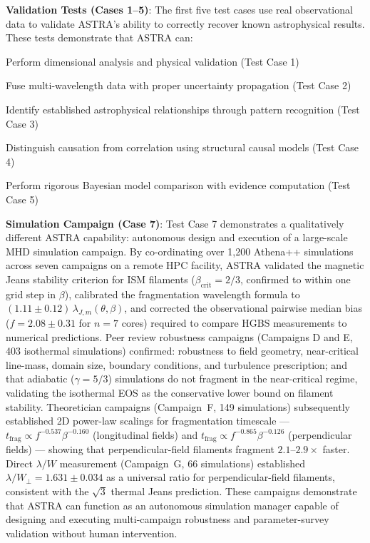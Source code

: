 \documentclass[usenatbib]{rasti}
\begin{document}
\textbf{Validation Tests (Cases 1--5)}: The first five test cases use real observational data to validate ASTRA's ability to correctly recover known astrophysical results. These tests demonstrate that ASTRA can:
\begin{description}
\item Perform dimensional analysis and physical validation (Test Case 1)
\item Fuse multi-wavelength data with proper uncertainty propagation (Test Case 2)
\item Identify established astrophysical relationships through pattern recognition (Test Case 3)
\item Distinguish causation from correlation using structural causal models (Test Case 4)
\item Perform rigorous Bayesian model comparison with evidence computation (Test Case 5)
\end{description}

\textbf{Simulation Campaign (Case 7)}: Test Case 7 demonstrates a qualitatively different
ASTRA capability: autonomous design and execution of a large-scale MHD simulation campaign.
By co-ordinating over 1,200 Athena++ simulations across seven campaigns on a remote HPC
facility, ASTRA validated the magnetic Jeans stability criterion for ISM filaments
($\beta_\mathrm{crit} = 2/3$, confirmed to within one grid step in $\beta$), calibrated the
fragmentation wavelength formula to $(1.11 \pm 0.12)\,\lambda_{J,m}(\theta,\beta)$, and
corrected the observational pairwise median bias ($f=2.08 \pm 0.31$ for $n=7$ cores) required
to compare HGBS measurements to numerical predictions. Peer review robustness campaigns
(Campaigns D and E, 403 isothermal simulations) confirmed: robustness to field geometry,
near-critical line-mass, domain size, boundary conditions, and turbulence prescription; and
that adiabatic ($\gamma = 5/3$) simulations do not fragment in the near-critical regime,
validating the isothermal EOS as the conservative lower bound on filament stability.
Theoretician campaigns (Campaign~F, 149 simulations) subsequently established 2D power-law
scalings for fragmentation timescale --- $t_\mathrm{frag} \propto f^{-0.537}\beta^{-0.160}$
(longitudinal fields) and $t_\mathrm{frag} \propto f^{-0.865}\beta^{-0.126}$ (perpendicular
fields) --- showing that perpendicular-field filaments fragment $2.1$--$2.9\times$ faster.
Direct $\lambda/W$ measurement (Campaign~G, 66 simulations) established $\lambda/W_\perp =
1.631 \pm 0.034$ as a universal ratio for perpendicular-field filaments, consistent with the
$\sqrt{3}$ thermal Jeans prediction.
These campaigns demonstrate that ASTRA can function as an autonomous simulation manager
capable of designing and executing multi-campaign robustness and parameter-survey validation
without human intervention.
\end{document}
